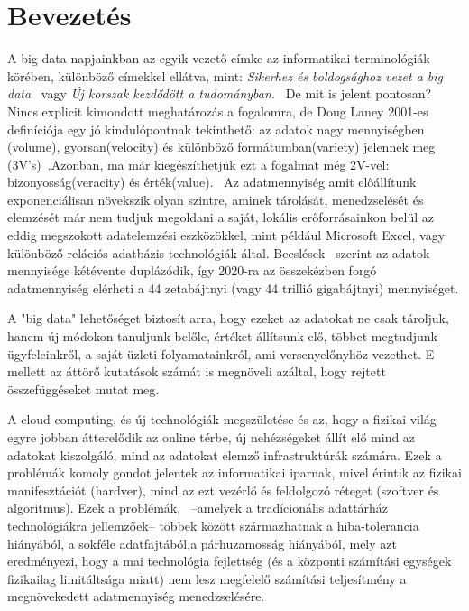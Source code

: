 \documentclass[a4paper,12pt]{article}
\author{Belényesi Roland}
\begin{document}
\section{Bevezetés}
A big data napjainkban az egyik vezető címke az informatikai terminológiák körében, különböző címekkel ellátva, mint: 
\textsl{Sikerhez és boldogsághoz vezet a big data}~\cite{ori} vagy 
\textsl{Új korszak kezdődött a tudományban.}~\cite{oria} De mit is jelent pontosan? Nincs explicit kimondott meghatározás a fogalomra, de Doug Laney 2001-es definíciója egy jó kindulópontnak tekinthető: az adatok nagy mennyiségben (volume), gyorsan(velocity) és különböző formátumban(variety) jelennek meg (3V's)~\cite{3v}.Azonban, ma már kiegészíthetjük ezt a fogalmat még 2V-vel: bizonyosság(veracity) és érték(value).~\cite{5v} Az adatmennyiség amit előállítunk exponenciálisan növekszik olyan szintre, aminek tárolását, menedzselését és elemzését már nem tudjuk megoldani a saját, lokális erőforrásainkon belül az eddig megszokott adatelemzési eszközökkel, mint például Microsoft Excel, vagy különböző relációs adatbázis technológiák által.
Becslések~\cite{2020} szerint az adatok mennyisége kétévente duplázódik, így 2020-ra az összekézben forgó adatmennyiség elérheti a 44 zetabájtnyi (vagy 44 trillió gigabájtnyi) mennyiséget.
\linebreak

A "big data" lehetőséget biztosít arra, hogy ezeket az adatokat ne csak tároljuk, hanem új módokon tanuljunk belőle, értéket állítsunk elő, többet megtudjunk ügyfeleinkről, a saját üzleti folyamatainkról, ami versenyelőnyhöz vezethet. E mellett az áttörő kutatások számát is megnöveli azáltal, hogy rejtett összefüggéseket mutat meg.~\cite{brk} 

A cloud computing, és új technológiák megszületése és az, hogy a fizikai világ egyre jobban átterelődik az online térbe, új nehézségeket állít elő mind az adatokat kiszolgáló, mind az adatokat elemző infrastruktúrák számára. Ezek a problémák komoly gondot jelentek az informatikai iparnak, mivel érintik az fizikai manifesztációt (hardver), mind az ezt vezérlő és feldolgozó réteget (szoftver és algoritmus). Ezek a problémák,~\cite{dst} --amelyek a tradícionális adattárház technológiákra jellemzőek-- többek között származhatnak a hiba-tolerancia hiányából, a sokféle adatfajtából,a párhuzamosság hiányából, mely azt eredményezi, hogy a mai technológia fejlettség (és a központi számítási egységek fizikailag limitáltsága miatt) nem lesz megfelelő számítási teljesítmény a megnövekedett adatmennyiség menedzselésére.
\end{document}
